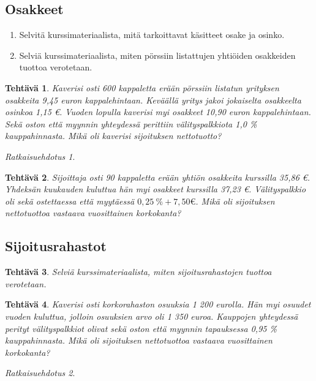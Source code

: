 \documentclass{article}\usepackage[]{graphicx}\usepackage[]{color}
\newtheorem{teht}{Tehtävä}
\theoremstyle{remark}
\newtheorem*{ratk}{Ratkaisuehdotus}
\begin{document}
\subsection*{Osakkeet}

\begin{enumerate}
  \item Selvitä kurssimateriaalista, mitä tarkoittavat käsitteet osake ja osinko.
  \item Selviä kurssimateriaalista, miten pörssiin listattujen yhtiöiden osakkeiden tuottoa verotetaan.
\end{enumerate}
 
\begin{teht} Kaverisi osti 600 kappaletta erään pörssiin listatun yrityksen osakkeita 9{,}45 euron kappalehintaan. Keväällä yritys jakoi jokaiselta osakkeelta osinkoa 1{,}15 \euro. Vuoden lopulla kaverisi myi osakkeet 10{,}90 euron kappalehintaan. Sekä oston että myynnin yhteydessä perittiin välityspalkkiota 1{,}0 \% kauppahinnasta. Mikä oli kaverisi sijoituksen nettotuotto?
\end{teht}\begin{ratk}\end{ratk}

\begin{teht} Sijoittaja osti 90 kappaletta erään yhtiön osakkeita kurssilla 35{,}86 \euro. Yhdeksän kuukauden kuluttua hän myi osakkeet kurssilla 37{,}23 \euro. Välityspalkkio oli sekä ostettaessa että myytäessä $0{,}25\ \%  + 7{,}50 \euro$. Mikä oli sijoituksen nettotuottoa vastaava vuosittainen korkokanta?
\end{teht}

\subsection*{Sijoitusrahastot}

\begin{teht} Selviä kurssimateriaalista, miten sijoitusrahastojen tuottoa verotetaan.

\end{teht}

\begin{teht} Kaverisi osti korkorahaston osuuksia 1 200 eurolla. Hän myi osuudet vuoden kuluttua, jolloin osuuksien arvo oli 1 350 euroa. Kauppojen yhteydessä perityt välityspalkkiot olivat sekä oston että myynnin tapauksessa 0{,}95 \% kauppahinnasta. Mikä oli sijoituksen nettotuottoa vastaava vuosittainen korkokanta?

\end{teht}\begin{ratk}\end{ratk}
\end{document}

